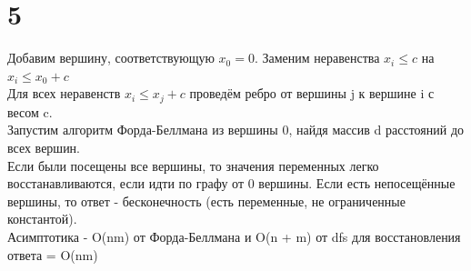 \documentclass[12pt]{extarticle}
\begin{document}
\section*{5}
Добавим вершину, соответствующую $x_0 = 0$. Заменим неравенства $x_i \leq c$ на $x_i \leq x_0 + c$\\
Для всех неравенств $x_i \leq x_j + c$ проведём ребро от вершины j к вершине i с весом c.\\
Запустим алгоритм Форда-Беллмана из вершины 0, найдя массив d расстояний до всех вершин.\\
Если были посещены все вершины, то значения переменных легко восстанавливаются, если идти по графу от 0 вершины. Если есть непосещённые вершины, то ответ - бесконечность (есть переменные, не ограниченные константой).\\
Асимптотика - O(nm) от Форда-Беллмана и O(n + m) от dfs для восстановления ответа = O(nm)
\end{document}
